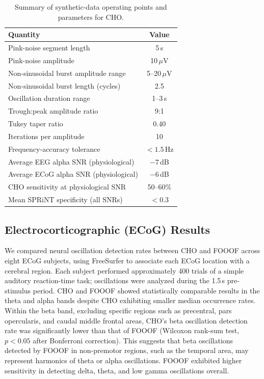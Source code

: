 \documentclass[11pt]{article}
\begin{document}
\begin{table}[htbp]
\centering
\caption{Summary of synthetic-data operating points and parameters for CHO.}
\label{tab:synth}
\begin{tabular}{lc}
\toprule
Quantity & Value \\
\midrule
Pink-noise segment length & 5\,s \\
Pink-noise amplitude & 10\,$\mu$V \\
Non-sinusoidal burst amplitude range & 5--20\,$\mu$V \\
Non-sinusoidal burst length (cycles) & 2.5 \\
Oscillation duration range & 1--3\,s \\
Trough:peak amplitude ratio & 9:1 \\
Tukey taper ratio & 0.40 \\
Iterations per amplitude & 10 \\
Frequency-accuracy tolerance & $< 1.5$\,Hz \\
Average EEG alpha SNR (physiological) & $-7$\,dB \\
Average ECoG alpha SNR (physiological) & $-6$\,dB \\
CHO sensitivity at physiological SNR & 50--60\% \\
Mean SPRiNT specificity (all SNRs) & $<0.3$ \\
\bottomrule
\end{tabular}
\end{table}

\subsection{Electrocorticographic (ECoG) Results}
We compared neural oscillation detection rates between CHO and FOOOF across eight ECoG subjects, using FreeSurfer \citep{fischl2012} to associate each ECoG location with a cerebral region. Each subject performed approximately 400 trials of a simple auditory reaction-time task; oscillations were analyzed during the 1.5\,s pre-stimulus period. CHO and FOOOF showed statistically comparable results in the theta and alpha bands despite CHO exhibiting smaller median occurrence rates. Within the beta band, excluding specific regions such as precentral, pars opercularis, and caudal middle frontal areas, CHO's beta oscillation detection rate was significantly lower than that of FOOOF (Wilcoxon rank-sum test, $p < 0.05$ after Bonferroni correction). This suggests that beta oscillations detected by FOOOF in non-premotor regions, such as the temporal area, may represent harmonics of theta or alpha oscillations. FOOOF exhibited higher sensitivity in detecting delta, theta, and low gamma oscillations overall.
\end{document}
